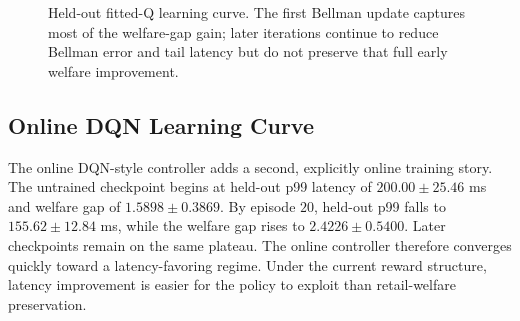 \documentclass[11pt]{article}
\begin{document}
\begin{figure}[t]
\centering
{}
\caption{Held-out fitted-Q learning curve. The first Bellman update captures most of the welfare-gap gain; later iterations continue to reduce Bellman error and tail latency but do not preserve that full early welfare improvement.}
\end{figure}

\subsection{Online DQN Learning Curve}
The online DQN-style controller adds a second, explicitly online training story. The untrained checkpoint begins at held-out p99 latency of $200.00 \pm 25.46$ ms and welfare gap of $1.5898 \pm 0.3869$. By episode $20$, held-out p99 falls to $155.62 \pm 12.84$ ms, while the welfare gap rises to $2.4226 \pm 0.5400$. Later checkpoints remain on the same plateau. The online controller therefore converges quickly toward a latency-favoring regime. Under the current reward structure, latency improvement is easier for the policy to exploit than retail-welfare preservation.
\end{document}
